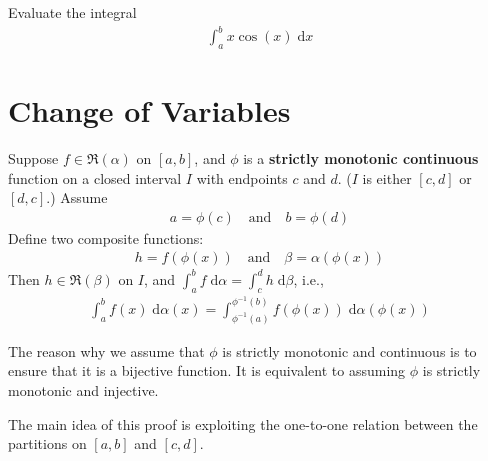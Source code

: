 \documentclass[thmcnt=section, 12pt]{my-elegantbook}
\begin{document}

\begin{exercise}
    Evaluate the integral
    \begin{align*}
        \int_{a}^{b} x \cos(x) \; \mathrm{d}x
    \end{align*}
\end{exercise}


\section{Change of Variables}


\begin{theorem} \label{thm:21}
    Suppose $f \in \mathfrak{R}(\alpha)$ on $[a, b]$,
    and $\phi$ is a \textbf{strictly monotonic continuous} function
    on a closed interval $I$ with endpoints $c$ and $d$.
    ($I$ is either $[c, d]$ or $[d, c]$.)
    Assume
    \begin{align*}
        a = \phi(c)
        \quad \text{and} \quad
        b = \phi(d)
    \end{align*}
    Define two composite functions:
    \begin{align*}
        h = f(\phi(x))
        \quad \text{and} \quad
        \beta = \alpha(\phi(x))
    \end{align*}
    Then $h \in \mathfrak{R}(\beta)$ on $I$,
    and $\int_a^b f \; \mathrm{d}\alpha = \int_c^d h \; \mathrm{d}\beta$,
    i.e.,
    \begin{align*}
        \int_a^b f(x) \; \mathrm{d}\alpha(x)
        = \int_{\phi^{-1}(a)}^{\phi^{-1}(b)}
        f(\phi(x)) \; \mathrm{d}\alpha(\phi(x))
    \end{align*}
\end{theorem}

\begin{note}
    The reason why we assume that $\phi$ is strictly monotonic
    and continuous is to ensure that it is a bijective function.
    It is equivalent to assuming $\phi$ is strictly
    monotonic and injective.
\end{note}

The main idea of this proof is exploiting
the one-to-one relation
between the partitions on $[a, b]$ and $[c, d]$.
\end{document}
